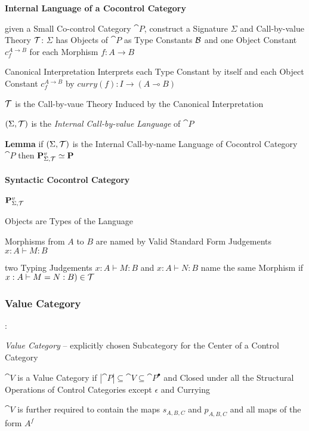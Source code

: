 \textbf{Internal Language of a Cocontrol Category}

given a Small Co-control Category $\cat{P}$, construct a Signature
$\Sigma$ and Call-by-value Theory $\mathcal{T}$: $\Sigma$ has Objects of
$\cat{P}$ as Type Constants $\mathcal{B}$ and one Object Constant
$c_f^{A \rightarrow B}$ for each Morphism $f : A \rightarrow B$

Canonical Interpretation Interprets each Type Constant by itself and
each Object Constant $c_f^{A \rightarrow B}$ by $curry(f): I
\rightarrow (A \multimap B)$

$\mathcal{T}$ is the Call-by-vaue Theory Induced by the Canonical
Interpretation

$(\Sigma,\mathcal{T})$ is the \emph{Internal Call-by-value Language} of
$\cat{P}$

\textbf{Lemma} if $(\Sigma,\mathcal{T})$ is the Internal Call-by-name
Language of Cocontrol Category $\cat{P}$ then
$\mathbf{P}^v_{\Sigma,\mathcal{T}} \simeq \mathbf{P}$


\paragraph{Syntactic Cocontrol Category}
\label{sec:syntactic_cocontrol_category}\hfill

$\mathbf{P}^v_{\Sigma,\mathcal{T}}$

Objects are Types of the Language

Morphisms from $A$ to $B$ are named by Valid Standard Form Judgements
$x:A \vdash M:B$

two Typing Judgements $x:A \vdash M:B$ and $x:A \vdash N:B$ name the
same Morphism if $x:A \vdash M = N:B) \in \mathcal{T}$



\subsubsection{Value Category}\label{sec:value_category}

\cite{selinger01}:

\emph{Value Category} -- explicitly chosen Subcategory for the Center
of a Control Category

$\cat{V}$ is a Value Category if $|\cat{P}| \subseteq \cat{V}
\subseteq \cat{P}^\bullet$ and Closed under all the Structural
Operations of Control Categories except $\epsilon$ and Currying

$\cat{V}$ is further required to contain the maps $s_{A,B,C}$ and
$p_{A,B,C}$ and all maps of the form $A^f$


